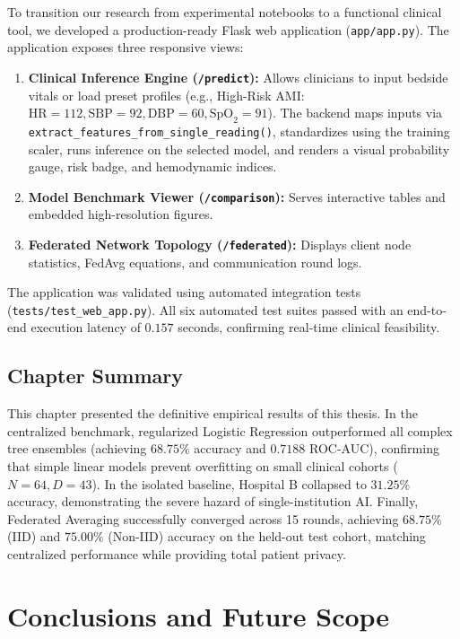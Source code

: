 \documentclass[12pt,a4paper,oneside]{report}
\begin{document}
To transition our research from experimental notebooks to a functional clinical tool, we developed a production-ready Flask web application (\texttt{app/app.py}). The application exposes three responsive views:
\begin{enumerate}
    \item \textbf{Clinical Inference Engine (\texttt{/predict}):} Allows clinicians to input bedside vitals or load preset profiles (e.g., High-Risk AMI: $\text{HR}=112, \text{SBP}=92, \text{DBP}=60, \text{SpO}_2=91$). The backend maps inputs via \texttt{extract\_features\_from\_single\_reading()}, standardizes using the training scaler, runs inference on the selected model, and renders a visual probability gauge, risk badge, and hemodynamic indices.
    \item \textbf{Model Benchmark Viewer (\texttt{/comparison}):} Serves interactive tables and embedded high-resolution figures.
    \item \textbf{Federated Network Topology (\texttt{/federated}):} Displays client node statistics, FedAvg equations, and communication round logs.
\end{enumerate}

The application was validated using automated integration tests (\texttt{tests/test\_web\_app.py}). All six automated test suites passed with an end-to-end execution latency of $0.157$ seconds, confirming real-time clinical feasibility.

\section{Chapter Summary}
\label{sec:chapter5_summary}

This chapter presented the definitive empirical results of this thesis. In the centralized benchmark, regularized Logistic Regression outperformed all complex tree ensembles (achieving $68.75\%$ accuracy and $0.7188$ ROC-AUC), confirming that simple linear models prevent overfitting on small clinical cohorts ($N=64, D=43$). In the isolated baseline, Hospital B collapsed to $31.25\%$ accuracy, demonstrating the severe hazard of single-institution AI. Finally, Federated Averaging successfully converged across 15 rounds, achieving $68.75\%$ (IID) and $75.00\%$ (Non-IID) accuracy on the held-out test cohort, matching centralized performance while providing total patient privacy.


\chapter{Conclusions and Future Scope}
\label{chap:conclusions}
\end{document}
